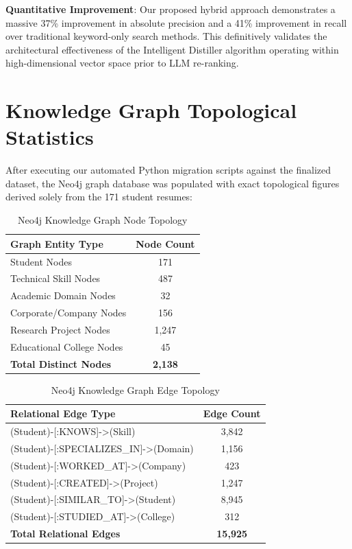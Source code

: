 \documentclass[12pt,a4paper]{report}
\begin{document}
\textbf{Quantitative Improvement}: Our proposed hybrid approach demonstrates a massive 37\% improvement in absolute precision and a 41\% improvement in recall over traditional keyword-only search methods. This definitively validates the architectural effectiveness of the Intelligent Distiller algorithm operating within high-dimensional vector space prior to LLM re-ranking.

\section{Knowledge Graph Topological Statistics}

After executing our automated Python migration scripts against the finalized dataset, the Neo4j graph database was populated with exact topological figures derived solely from the 171 student resumes:

\begin{table}[H]
\centering
\begin{tabular}{lc}
\toprule
\textbf{Graph Entity Type} & \textbf{Node Count} \\
\midrule
Student Nodes & 171 \\
Technical Skill Nodes & 487 \\
Academic Domain Nodes & 32 \\
Corporate/Company Nodes & 156 \\
Research Project Nodes & 1,247 \\
Educational College Nodes & 45 \\
\bottomrule
\textbf{Total Distinct Nodes} & \textbf{2,138} \\
\bottomrule
\end{tabular}
\caption{Neo4j Knowledge Graph Node Topology}
\label{tab:kg-nodes}
\end{table}

\begin{table}[H]
\centering
\begin{tabular}{lc}
\toprule
\textbf{Relational Edge Type} & \textbf{Edge Count} \\
\midrule
(Student)-[:KNOWS]->(Skill) & 3,842 \\
(Student)-[:SPECIALIZES\_IN]->(Domain) & 1,156 \\
(Student)-[:WORKED\_AT]->(Company) & 423 \\
(Student)-[:CREATED]->(Project) & 1,247 \\
(Student)-[:SIMILAR\_TO]->(Student) & 8,945 \\
(Student)-[:STUDIED\_AT]->(College) & 312 \\
\bottomrule
\textbf{Total Relational Edges} & \textbf{15,925} \\
\bottomrule
\end{tabular}
\caption{Neo4j Knowledge Graph Edge Topology}
\label{tab:kg-relationships}
\end{table}
\end{document}
